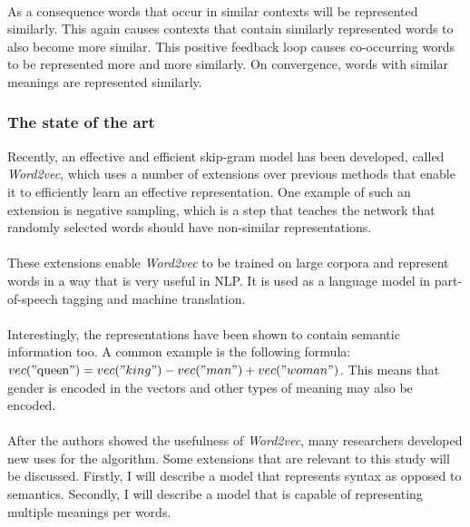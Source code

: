 \documentclass{article}
\begin{document}
 \paragraph{}
 As a consequence words that occur in similar contexts will be represented similarly. This again causes contexts that contain similarly represented words to also become more similar. This positive feedback loop causes co-occurring words to be represented more and more similarly. On convergence, words with similar meanings are represented similarly.
 
 \subsubsection{The state of the art}
 Recently, an effective and efficient skip-gram model has been developed, called \emph{Word2vec}, which uses a number of extensions over previous methods that enable it to efficiently learn an effective representation\cite{w2v}. One example of such an extension is negative sampling, which is a step that teaches the network that randomly selected words should have non-similar representations.
 \paragraph{}
 These extensions enable \emph{Word2vec} to be trained on large corpora and represent words in a way that is very useful in NLP. It is used as a language model in part-of-speech tagging and machine translation.
 \paragraph{}
 Interestingly, the representations have been shown to contain semantic information too. A common example is the following formula: $vec("\text{queen}") = vec("king") - vec("man") + vec("woman")$. This means that gender is encoded in the vectors and other types of meaning may also be encoded.
 \paragraph{}
 After the authors showed the usefulness of \emph{Word2vec}, many researchers developed new uses for the algorithm. Some extensions that are relevant to this study will be discussed. Firstly, I will describe a model that represents syntax as opposed to semantics. Secondly, I will describe a model that is capable of representing multiple meanings per words.
 
\end{document}
